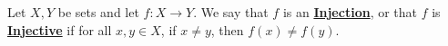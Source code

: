 \newcommand{\Injective}[0]{\textbf{\hyperref[def:Injective]{Injective}}\xspace}
\newcommand{\Injectivity}[0]{\textbf{\hyperref[def:Injective]{Injectiveness}}\xspace}
\newcommand{\Injection}[0]{\textbf{\hyperref[def:Injective]{Injection}}\xspace}
\newcommand{\Injections}[0]{\textbf{\hyperref[def:Injective]{Injections}}\xspace}
\begin{df}[Injective]
\label{def:Injective}

\rm
    Let $X,Y$ be sets and let 
    $f:X \to Y$. 
    We say that $f$ is 
    an 
    \Injection, 
    or that $f$ is 
    \Injective if 
    for all $x,y \in X$, 
    if $x \neq y$, then 
    $f(x) \neq f(y)$. 
\end{df}
    
